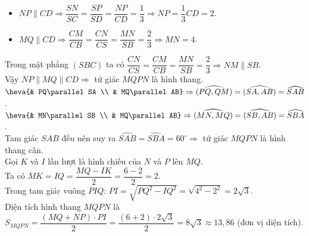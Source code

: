 \begin{bt}
{\begin{itemize}
			\item [\color{teal}\faCheckCircleO] $NP\parallel CD\Rightarrow\dfrac{SN}{SC}=\dfrac{SP}{SD}=\dfrac{NP}{CD}=\dfrac{1}{3}\Rightarrow NP=\dfrac{1}{3}CD=2$.
			\item [\color{teal}\faCheckCircleO] $MQ\parallel CD\Rightarrow\dfrac{CM}{CB}=\dfrac{CN}{CS}=\dfrac{MN}{SB}=\dfrac{2}{3}\Rightarrow MN=4$.
		\end{itemize}
		Trong mặt phẳng $(SBC)$ ta có $\dfrac{CN}{CS}=\dfrac{CM}{CB}=\dfrac{MN}{SB}=\dfrac{2}{3}\Rightarrow NM\parallel SB$.\\
		Vậy $NP\parallel MQ\parallel CD\Rightarrow $ tứ giác $MQPN$ là hình thang.\\
		$\heva{& PQ\parallel SA \\ & MQ\parallel AB}\Rightarrow\widehat{\left(PQ,QM\right)}=\widehat{\left(SA,AB\right)}=\widehat{SAB}$.\\
		$\heva{& MN\parallel SB \\ & MQ\parallel AB}\Rightarrow\widehat{\left(MN,MQ\right)}=\widehat{\left(SB,AB\right)}=\widehat{SBA}$.\\
		Tam giác $SAB$ đều nên suy ra $\widehat{SAB}=\widehat{SBA}=60^\circ\Rightarrow$ tứ giác $MQPN$ là hình thang cân.\\
		Gọi $K$ và $I$ lần lượt là hình chiếu của $N$ và $P$ lên $MQ$. \\
		Ta có $MK=IQ=\dfrac{MQ-IK}{2}=\dfrac{6-2}{2}=2$.\\
		Trong tam giác vuông $PIQ$: $PI=\sqrt{PQ^2-IQ^2}=\sqrt{4^2-2^2}=2\sqrt{3}$.\\
		Diện tích hình thang $MQPN$ là $S_{MQPN}=\dfrac{\left(MQ+NP\right)\cdot PI}{2}=\dfrac{\left(6+2\right)\cdot 2\sqrt{3}}{2}=8\sqrt{3}\approx 13{,}86$ (đơn vị diện tích).
	}
\end{bt}

